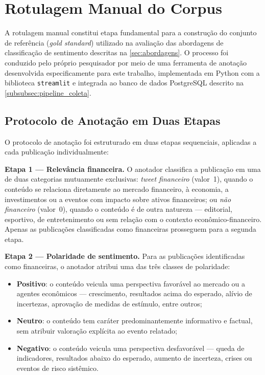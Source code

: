 
\section{Rotulagem Manual do Corpus}
\label{sec:rotulagem}

A rotulagem manual constitui etapa fundamental para a construção do conjunto de referência (\textit{gold standard}) utilizado na avaliação das abordagens de classificação de sentimento descritas na \autoref{sec:abordagens}. O processo foi conduzido pelo próprio pesquisador por meio de uma ferramenta de anotação desenvolvida especificamente para este trabalho, implementada em Python com a biblioteca \texttt{streamlit} e integrada ao banco de dados PostgreSQL descrito na \autoref{subsubsec:pipeline_coleta}.

\subsection{Protocolo de Anotação em Duas Etapas}
\label{subsec:protocolo_anotacao}

O protocolo de anotação foi estruturado em duas etapas sequenciais, aplicadas a cada publicação individualmente:

\textbf{Etapa 1 — Relevância financeira.} O anotador classifica a publicação em uma de duas categorias mutuamente exclusivas: \textit{tweet financeiro} (valor~1), quando o conteúdo se relaciona diretamente ao mercado financeiro, à economia, a investimentos ou a eventos com impacto sobre ativos financeiros; ou \textit{não financeiro} (valor~0), quando o conteúdo é de outra natureza — editorial, esportivo, de entretenimento ou sem relação com o contexto econômico-financeiro. Apenas as publicações classificadas como financeiras prosseguem para a segunda etapa.

\textbf{Etapa 2 — Polaridade de sentimento.} Para as publicações identificadas como financeiras, o anotador atribui uma das três classes de polaridade:

\begin{itemize}
	\item \textbf{Positivo}: o conteúdo veicula uma perspectiva favorável ao mercado ou a agentes econômicos — crescimento, resultados acima do esperado, alívio de incertezas, aprovação de
	medidas de estímulo, entre outros;
	
	\item \textbf{Neutro}: o conteúdo tem caráter predominantemente informativo e factual, sem atribuir valoração explícita ao evento relatado;

	\item \textbf{Negativo}: o conteúdo veicula uma perspectiva desfavorável — queda de indicadores, resultados abaixo do esperado, aumento de incerteza, crises ou eventos de risco sistêmico.
\end{itemize}

